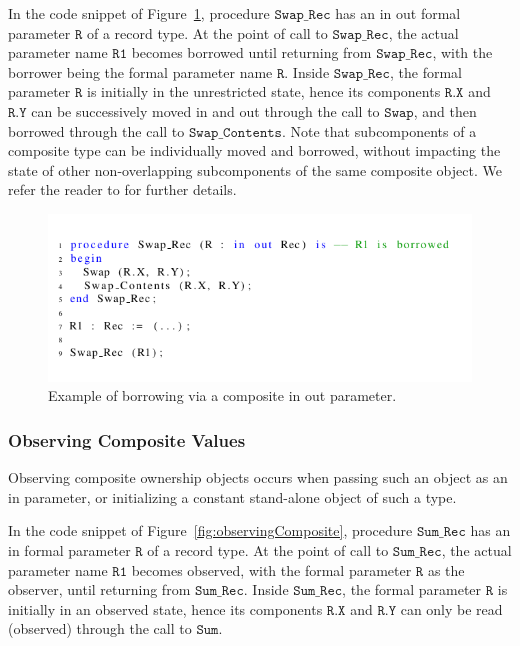 \documentclass{llncs}
\newcommand\var[1]{\ensuremath{\mathtt{#1}}}
\newcommand{\keyword}[1]{\textsf{#1}}
\begin{document}
In the code snippet of Figure~\ref{fig:borrowingComposite}, procedure \var{Swap\_Rec} has an \keyword{in out} formal parameter \var{R} of a record type. At the point of
call to \var{Swap\_Rec}, the actual parameter name \var{R1} becomes borrowed until returning from \var{Swap\_Rec}, with the borrower being the formal parameter name \var{R}.  Inside \var{Swap\_Rec}, the formal parameter \var{R} is initially
in the unrestricted state, hence its components \var{R.X} and \var{R.Y} can be successively moved in and out through the call to \var{Swap}, and then borrowed through the call to \var{Swap\_Contents}.
Note that subcomponents of a composite type can be individually moved and borrowed, without impacting the state of other non-overlapping subcomponents of the same composite object.
We refer the reader to \cite{AI2018} for further details.

\begin{figure}[htb!]
\centering
   \includegraphics[]{borrowingComposite}
   \caption{Example of borrowing via a composite \keyword{in out} parameter.}
   \label{fig:borrowingComposite}
\end{figure}


\subsubsection{Observing Composite Values}
\label{subsubsec:extendingBorrowing}

Observing composite ownership objects occurs when passing such an object as an \keyword{in} parameter, or initializing a constant stand-alone object of such a type.

In the code snippet of Figure~\ref{fig:observingComposite}, procedure \var{Sum\_Rec} has an \keyword{in} formal parameter \var{R} of a record type.
At the point of call to \var{Sum\_Rec}, the actual parameter name \var{R1} becomes observed, with the formal parameter \var{R} as the observer, until returning from \var{Sum\_Rec}. Inside \var{Sum\_Rec},
the formal parameter \var{R} is initially in an observed state, hence its components \var{R.X} and \var{R.Y} can only be read (observed) through the call to \var{Sum}.
\end{document}
